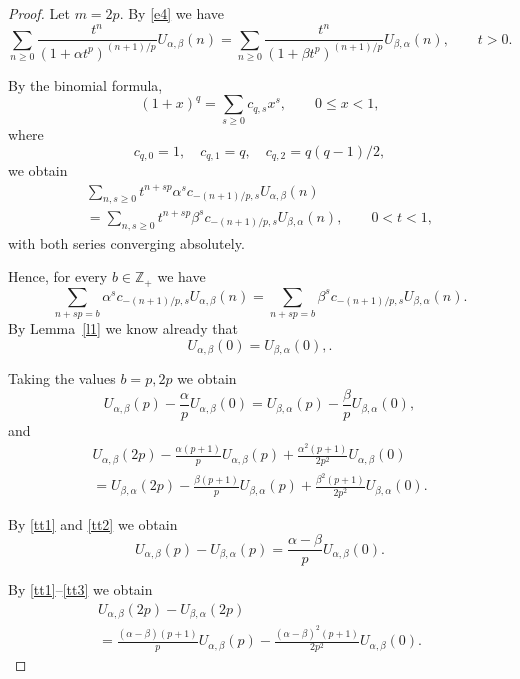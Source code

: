 \documentclass[10pt,a4paper]{amsart}
\begin{document}
\begin{proof} Let $m=2p$. By \eqref{e4} we have
$$
\sum_{n\ge 0} \frac{t^n}{(1+\alpha t^p)^{(n+1)/p}}U_{\alpha,\beta}(n)=\sum_{n\ge 0} \frac{t^n}{(1+\beta t^p)^{(n+1)/p}}U_{\beta,\alpha}(n),\qquad t>0.
$$

By the binomial formula, 
$$
(1+x)^q=\sum_{s\ge 0}c_{q,s}x^s,\qquad 0\le x<1,
$$
where 
$$
c_{q,0}=1,\quad c_{q,1}=q,\quad c_{q,2}=q(q-1)/2,
$$
we obtain
\begin{multline}
\sum_{n,s\ge 0}t^{n+sp}\alpha^s c_{-(n+1)/p,s}U_{\alpha,\beta}(n)\\=\sum_{n,s\ge 0}t^{n+sp}\beta^s c_{-(n+1)/p,s}U_{\beta,\alpha}(n),\qquad 0<t<1,
\end{multline}
with both series converging absolutely.

Hence, for every $b\in\mathbb Z_+$ we have
$$
\sum_{n+sp=b} \alpha^s c_{-(n+1)/p,s}U_{\alpha,\beta}(n)=\sum_{n+sp=b}\beta^s c_{-(n+1)/p,s}U_{\beta,\alpha}(n).
$$
By Lemma~\ref{l1} we know already that 
\begin{equation}
U_{\alpha,\beta}(0)=U_{\beta,\alpha}(0),\label{tt1}.
\end{equation}

Taking the values $b=p,2p$ we obtain 
\begin{equation}
U_{\alpha,\beta}(p)-\frac{\alpha}p U_{\alpha,\beta}(0)=U_{\beta,\alpha}(p)-\frac{\beta}p U_{\beta,\alpha}(0),\label{tt2}
\end{equation}
and
\begin{multline}
U_{\alpha,\beta}(2p)-\frac{\alpha(p+1)}p U_{\alpha,\beta}(p)+\frac{\alpha^2(p+1)}{2p^2}U_{\alpha,\beta}(0)\\=U_{\beta,\alpha}(2p)-\frac{\beta(p+1)}p U_{\beta,\alpha}(p)+\frac{\beta^2(p+1)}{2p^2}U_{\beta,\alpha}(0).\label{tt3}
\end{multline}

By \eqref{tt1} and \eqref{tt2} we obtain
\begin{equation}
U_{\alpha,\beta}(p)-U_{\beta,\alpha}(p)= \frac{\alpha-\beta}p U_{\alpha,\beta}(0).
\label{tt4}
\end{equation}

By \eqref{tt1}--\eqref{tt3} we obtain
\begin{multline}
U_{\alpha,\beta}(2p)-U_{\beta,\alpha}(2p)\\=\frac{(\alpha-\beta)(p+1)}p U_{\alpha,\beta}(p)-\frac{(\alpha-\beta)^2(p+1)}{2p^2}U_{\alpha,\beta}(0).
\label{tt5}
\end{multline}


\end{proof}
\end{document}
